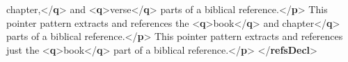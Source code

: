\begin{shaded}
\hspace*{1em}\hspace*{1em}chapter,{</\textbf{q}>} and {<\textbf{q}>}verse{</\textbf{q}>} parts of a biblical reference.{</\textbf{p}>}\mbox{}\newline 
{}\mbox{}\newline 
{}\mbox{}\newline 
\hspace*{1em}This pointer pattern extracts and references the {<\textbf{q}>}book{</\textbf{q}>} and\mbox{}\newline 
\hspace*{1em}chapter{</\textbf{q}>} parts of a biblical reference.{</\textbf{p}>}\mbox{}\newline 
{}\mbox{}\newline 
{}\mbox{}\newline 
\hspace*{1em}This pointer pattern extracts and references just the {<\textbf{q}>}book{</\textbf{q}>}\mbox{}\newline 
\hspace*{1em}\hspace*{1em}\hspace*{1em}\hspace*{1em} part of a biblical reference.{</\textbf{p}>}\mbox{}\newline 
{}\mbox{}\newline 
{</\textbf{refsDecl}>}\end{shaded}\egroup\par \par
